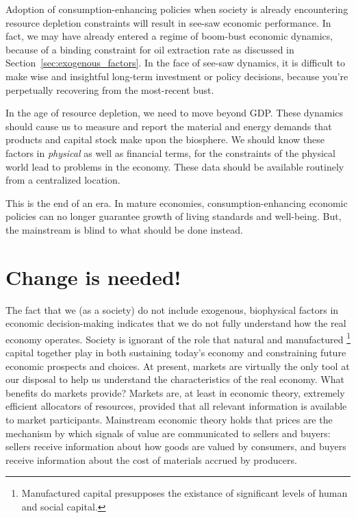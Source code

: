 Adoption of consumption-enhancing policies when society is already encountering
resource depletion constraints
will result in see-saw economic performance. 
In fact, we may have already entered a regime of boom-bust economic dynamics,
because of a binding constraint for oil extraction rate
as discussed in Section~\ref{sec:exogenous_factors}.
In the face of see-saw dynamics,
it is difficult to make wise and insightful long-term investment or policy decisions,
because you're perpetually recovering from the most-recent bust.

In the age of resource depletion, 
we need to move beyond GDP.
These dynamics should cause us to measure and report
the material and energy demands that products and capital stock 
make upon the biosphere.
We should know these factors 
in \emph{physical} as well as financial terms,
for the constraints of the physical world 
lead to problems in the economy.
These data should be available routinely from a centralized location.

This is the end of an era.
In mature economies, consumption-enhancing 
economic policies can no longer guarantee 
growth of living standards and well-being.
But, the mainstream is blind to what should be done instead. 


\section{Change is needed!}
\label{sec:change_needed}

The fact that we (as a society) do not include exogenous, biophysical factors 
in economic decision-making indicates that
we do not fully understand how the real economy operates.
Society is ignorant of the role that natural and manufactured%
	\footnote{
	Manufactured capital presupposes the existance of 
	significant levels of human and social capital.
	}
capital together play in both sustaining today's economy and 
constraining future economic prospects and choices.
At present, markets are virtually the only tool at our disposal
to help us understand the characteristics of the real economy.
What benefits do markets provide?
Markets are, at least in economic theory, extremely efficient allocators of resources,
provided that all relevant information is available to market participants.
Mainstream economic theory holds that prices are the mechanism by which signals
of value are communicated to sellers and buyers:
sellers receive information about how goods are valued by consumers, and
buyers receive information about the cost of materials accrued by producers.

